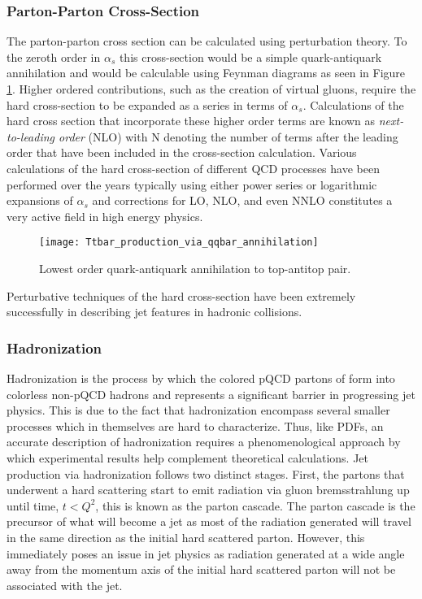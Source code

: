 \subsubsection{Parton-Parton Cross-Section}
The parton-parton cross section can be calculated using perturbation theory.  To the zeroth order in $\alpha_{s}$ this cross-section would be a simple quark-antiquark annihilation and would be calculable using Feynman diagrams as seen in Figure \ref{fig:qqbar}\cite{Collins:1989gx}.  Higher ordered contributions, such as the creation of virtual gluons, require the hard cross-section to be expanded as a series in terms of $\alpha_{s}$.  Calculations of the hard cross section that incorporate these higher order terms are known as \textit{next-to-leading order} (NLO) with N denoting the number of terms after the leading order that have been included in the cross-section calculation.  Various calculations of the hard cross-section of different QCD processes have been performed over the years typically using either power series or logarithmic expansions of $\alpha_{s}$\cite{Brambilla:2006wp} and corrections for LO, NLO, and even NNLO constitutes a very active field in high energy physics.

\begin{figure}[h]
\texttt{[image: Ttbar\_production\_via\_qqbar\_annihilation]}
\centering
\caption{Lowest order quark-antiquark annihilation to top-antitop pair\cite{Erdmann:2001ne}.}
\label{fig:qqbar}
\end{figure}

Perturbative techniques of the hard cross-section have been extremely successfully in describing jet features in hadronic collisions\cite{Fritzsch:1992mu}.
\subsubsection{Hadronization}

Hadronization is the process by which the colored pQCD partons of form into colorless non-pQCD hadrons and represents a significant barrier in progressing jet physics.  This is due to the fact that hadronization encompass several smaller processes which in themselves are hard to characterize. Thus, like PDFs, an accurate description of hadronization requires a phenomenological approach by which experimental results help complement theoretical calculations.  Jet production via hadronization\cite{Webber:1994zd} follows two distinct stages.  First, the partons that underwent a hard scattering start to emit radiation via gluon bremsstrahlung up until time, $t < Q^{2}$, this is known as the parton cascade.  The parton cascade is the precursor of what will become a jet as most of the radiation generated will travel in the same direction as the initial hard scattered parton.  However, this immediately poses an issue in jet physics as radiation generated at a wide angle away from the momentum axis of the initial hard scattered parton will not be associated with the jet.

